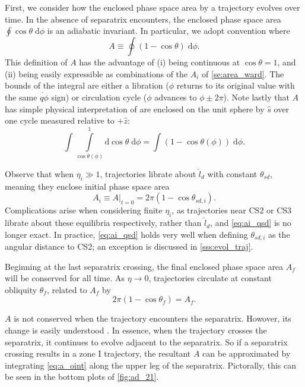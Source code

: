 \documentclass[
        fleqn,
        usenatbib,
        referee,
    ]{mnras}
\newcommand*{\at}[1]{\left.#1\right|}
\newcommand*{\p}[1]{\left(#1\right)}
\begin{document}
First, we consider how the enclosed phase space area by a trajectory evolves
over time. In the absence of separatrix encounters, the enclosed phase space
area $\oint \cos\theta \;\mathrm{d}\phi$ is an adiabatic invariant. In
particular, we adopt convention where
\begin{equation}
    A \equiv \oint \p{1 - \cos \theta}\;\mathrm{d}\phi.\label{eq:a_oint}
\end{equation}
This definition of $A$ has the advantage of (i) being continuous at $\cos \theta
= 1$, and (ii) being easily expressible as combinations of the $A_i$ of
\autoref{se:area_ward}. The bounds of the integral are either a libration
($\phi$ returns to its original value with the same $\dot{q\phi}$ sign) or
circulation cycle ($\phi$ advances to $\phi \pm 2\pi$). Note lastly that $A$ has
simple physical interpretation of are enclosed on the unit sphere by $\hat{s}$
over one cycle measured relative to $+\hat{z}$:
\begin{equation*}
    \int \int\limits_{\cos \theta(\phi)}^1
        \mathrm{d}\cos\theta\;\mathrm{d}\phi = \int \p{1 - \cos \theta(\phi)}
            \;\mathrm{d}\phi.
\end{equation*}

Observe that when $\eta_i \gg 1$, trajectories librate about $\hat{l}_d$ with
constant $\theta_{sd}$, meaning they enclose initial phase space area
\begin{equation}
    A_i \equiv \at{A}_{t = 0}
        = 2\pi\p{1 - \cos \theta_{sd, i}}.\label{eq:ai_qsd}
\end{equation}
Complications arise when considering finite $\eta_i$, as trajectories near CS2 or
CS3 librate about these equilibria respectively, rather than $\hat{l}_d$, and
\autoref{eq:ai_qsd} is no longer exact. In practice, \autoref{eq:ai_qsd} holds
very well when defining $\theta_{sd, i}$ as the angular distance to CS2; an
exception is discussed in \autoref{sss:evol_traj}.

Beginning at the last separatrix crossing, the final enclosed phase space area
$A_f$ will be conserved for all time. As $\eta \to 0$, trajectories circulate at
constant obliquity $\theta_f$, related to $A_f$ by
\begin{equation}
    2\pi\p{1 - \cos \theta_f} = A_f. \label{eq:qfaf}
\end{equation}

$A$ is not conserved when the trajectory encounters the separatrix. Howover,
its change is easily understood \citep{henrard1982}. In essence, when the
trajectory crosses the separatrix, it continues to evolve adjacent to the
separatrix. So if a separatrix crossing results in a zone I trajectory, the
resultant $A$ can be approximated by integrating \autoref{eq:a_oint} along the
upper leg of the separatrix. Pictorally, this can be seen in the bottom plots of
\autoref{fig:ad_21}.
\end{document}

